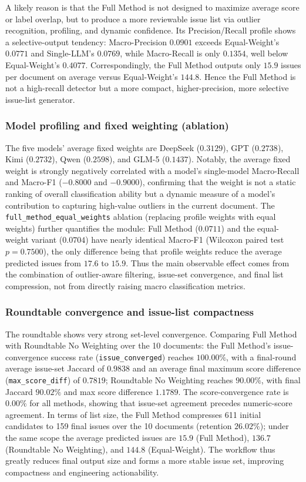 \documentclass[sn-mathphys-num]{sn-jnl}
\begin{document}
A likely reason is that the Full Method is not designed to maximize average score or label overlap, but to produce a more reviewable issue list via outlier recognition, profiling, and dynamic confidence. Its Precision/Recall profile shows a selective-output tendency: Macro-Precision $0.0901$ exceeds Equal-Weight's $0.0771$ and Single-LLM's $0.0769$, while Macro-Recall is only $0.1354$, well below Equal-Weight's $0.4077$. Correspondingly, the Full Method outputs only $15.9$ issues per document on average versus Equal-Weight's $144.8$. Hence the Full Method is not a high-recall detector but a more compact, higher-precision, more selective issue-list generator.

\subsubsection{Model profiling and fixed weighting (ablation)}

The five models' average fixed weights are DeepSeek ($0.3129$), GPT ($0.2738$), Kimi ($0.2732$), Qwen ($0.2598$), and GLM-5 ($0.1437$). Notably, the average fixed weight is strongly negatively correlated with a model's single-model Macro-Recall and Macro-F1 ($-0.8000$ and $-0.9000$), confirming that the weight is not a static ranking of overall classification ability but a dynamic measure of a model's contribution to capturing high-value outliers in the current document. The \texttt{full\_method\_equal\_weights} ablation (replacing profile weights with equal weights) further quantifies the module: Full Method ($0.0711$) and the equal-weight variant ($0.0704$) have nearly identical Macro-F1 (Wilcoxon paired test $p=0.7500$), the only difference being that profile weights reduce the average predicted issues from $17.6$ to $15.9$. Thus the main observable effect comes from the combination of outlier-aware filtering, issue-set convergence, and final list compression, not from directly raising macro classification metrics.

\subsubsection{Roundtable convergence and issue-list compactness}
The roundtable shows very strong set-level convergence. Comparing Full Method with Roundtable No Weighting over the 10 documents: the Full Method's issue-convergence success rate (\texttt{issue\_converged}) reaches $100.00\%$, with a final-round average issue-set Jaccard of $0.9838$ and an average final maximum score difference (\texttt{max\_score\_diff}) of $0.7819$; Roundtable No Weighting reaches $90.00\%$, with final Jaccard $90.02\%$ and max score difference $1.1789$. The score-convergence rate is $0.00\%$ for all methods, showing that issue-set agreement precedes numeric-score agreement. In terms of list size, the Full Method compresses 611 initial candidates to 159 final issues over the 10 documents (retention $26.02\%$); under the same scope the average predicted issues are $15.9$ (Full Method), $136.7$ (Roundtable No Weighting), and $144.8$ (Equal-Weight). The workflow thus greatly reduces final output size and forms a more stable issue set, improving compactness and engineering actionability.
\end{document}
